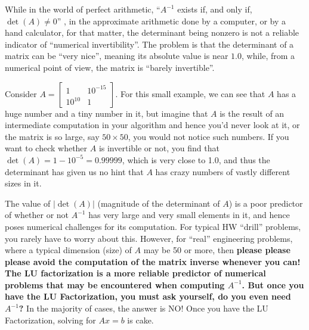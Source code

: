 \begin{tcolorbox}[sharp corners, colback=green!30, colframe=green!80!blue, title=\textbf{\large (Optional Read) Theory vs Reality: II}]
While in the world of perfect arithmetic, ``$A^{-1}$ exists if, and only if, $\det(A)\neq 0$'' , in the approximate arithmetic done by a computer, or by a hand calculator, for that matter, the determinant being nonzero is not a reliable indicator of ``numerical invertibility''. The problem is that the determinant of a matrix can be ``very nice'', meaning its absolute value is near $1.0$, while, from a numerical point of view, the matrix is ``barely invertible''. 
\end{tcolorbox}
\vspace*{1cm}

\begin{example}  Consider $A = \left[\begin{array}{cc} 1 & 10^{-15} \\ 10^{10} & 1\end{array} \right]$.  For this small example, we can see that $A$ has a huge number and a tiny number in it, but imagine that $A$ is the result of an intermediate computation in your algorithm and hence you'd never look at it, or the matrix is so large, say $50 \times 50$, you would not notice such numbers. If you want to check whether $A$ is invertible or not, you find that $\det(A)=1-10^{-5} =0.99999$, which is very close to 1.0, and thus the determinant has given us no hint that $A$ has crazy numbers of vastly different sizes in it. \Qed
\end{example}
\vspace*{0.1cm}

\begin{tcolorbox}[sharp corners, colback=green!30, colframe=green!80!blue, title=\textbf{\large (Optional Read) Theory vs Reality: III}]
The value of $|\det(A)|$ (magnitude of the determinant of $A$) is a poor predictor of whether or not $A^{-1}$ has very large and very small elements in it, and hence poses numerical challenges for its computation. For typical HW ``drill'' problems, you rarely have to worry about this. However, for ``real'' engineering problems, where a typical dimension (size) of $A$ may be 50 or more, then \textbf{please please please avoid the computation of the matrix inverse whenever you can!}\\

\textbf{The LU factorization is a more reliable predictor of numerical problems that may be encountered when computing $A^{-1}$. But once you have the LU Factorization, you must ask yourself, do you even need $A^{-1}$?} In the majority of cases, the answer is NO! Once you have the LU Factorization, solving for $Ax=b$ is cake.
\end{tcolorbox}


